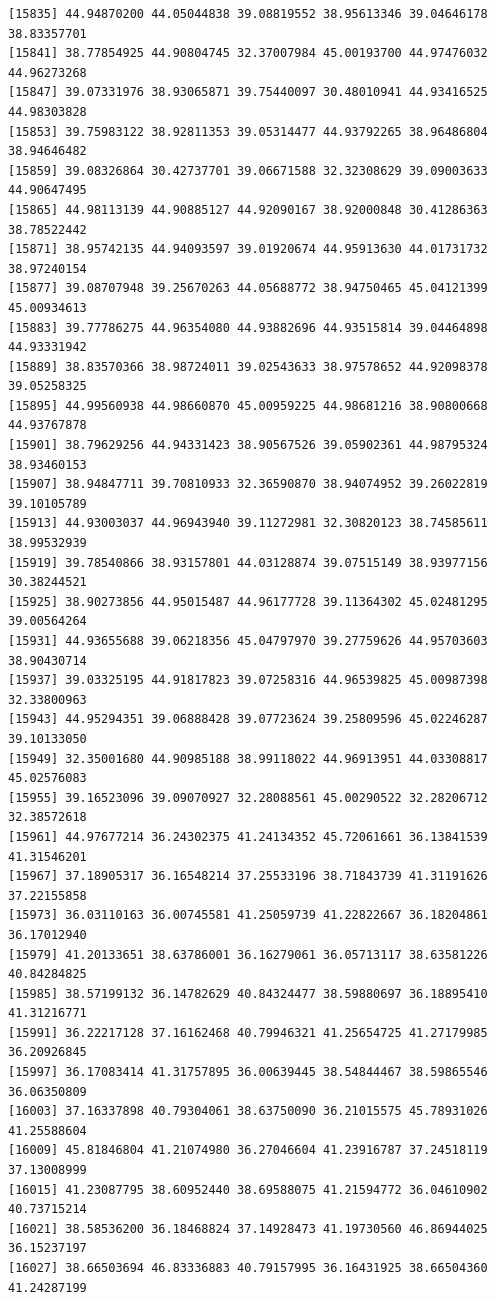 \documentclass[
  letterpaper,
  DIV=11,
  numbers=noendperiod]{scrartcl}
\begin{document}
\begin{verbatim}
[15835] 44.94870200 44.05044838 39.08819552 38.95613346 39.04646178 38.83357701
[15841] 38.77854925 44.90804745 32.37007984 45.00193700 44.97476032 44.96273268
[15847] 39.07331976 38.93065871 39.75440097 30.48010941 44.93416525 44.98303828
[15853] 39.75983122 38.92811353 39.05314477 44.93792265 38.96486804 38.94646482
[15859] 39.08326864 30.42737701 39.06671588 32.32308629 39.09003633 44.90647495
[15865] 44.98113139 44.90885127 44.92090167 38.92000848 30.41286363 38.78522442
[15871] 38.95742135 44.94093597 39.01920674 44.95913630 44.01731732 38.97240154
[15877] 39.08707948 39.25670263 44.05688772 38.94750465 45.04121399 45.00934613
[15883] 39.77786275 44.96354080 44.93882696 44.93515814 39.04464898 44.93331942
[15889] 38.83570366 38.98724011 39.02543633 38.97578652 44.92098378 39.05258325
[15895] 44.99560938 44.98660870 45.00959225 44.98681216 38.90800668 44.93767878
[15901] 38.79629256 44.94331423 38.90567526 39.05902361 44.98795324 38.93460153
[15907] 38.94847711 39.70810933 32.36590870 38.94074952 39.26022819 39.10105789
[15913] 44.93003037 44.96943940 39.11272981 32.30820123 38.74585611 38.99532939
[15919] 39.78540866 38.93157801 44.03128874 39.07515149 38.93977156 30.38244521
[15925] 38.90273856 44.95015487 44.96177728 39.11364302 45.02481295 39.00564264
[15931] 44.93655688 39.06218356 45.04797970 39.27759626 44.95703603 38.90430714
[15937] 39.03325195 44.91817823 39.07258316 44.96539825 45.00987398 32.33800963
[15943] 44.95294351 39.06888428 39.07723624 39.25809596 45.02246287 39.10133050
[15949] 32.35001680 44.90985188 38.99118022 44.96913951 44.03308817 45.02576083
[15955] 39.16523096 39.09070927 32.28088561 45.00290522 32.28206712 32.38572618
[15961] 44.97677214 36.24302375 41.24134352 45.72061661 36.13841539 41.31546201
[15967] 37.18905317 36.16548214 37.25533196 38.71843739 41.31191626 37.22155858
[15973] 36.03110163 36.00745581 41.25059739 41.22822667 36.18204861 36.17012940
[15979] 41.20133651 38.63786001 36.16279061 36.05713117 38.63581226 40.84284825
[15985] 38.57199132 36.14782629 40.84324477 38.59880697 36.18895410 41.31216771
[15991] 36.22217128 37.16162468 40.79946321 41.25654725 41.27179985 36.20926845
[15997] 36.17083414 41.31757895 36.00639445 38.54844467 38.59865546 36.06350809
[16003] 37.16337898 40.79304061 38.63750090 36.21015575 45.78931026 41.25588604
[16009] 45.81846804 41.21074980 36.27046604 41.23916787 37.24518119 37.13008999
[16015] 41.23087795 38.60952440 38.69588075 41.21594772 36.04610902 40.73715214
[16021] 38.58536200 36.18468824 37.14928473 41.19730560 46.86944025 36.15237197
[16027] 38.66503694 46.83336883 40.79157995 36.16431925 38.66504360 41.24287199

\end{verbatim}
\end{document}
